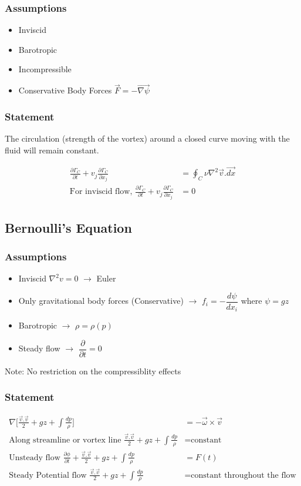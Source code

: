 \documentclass[11pt, letterpaper, notitlepage]{article}
\begin{document}
\subsubsection{Assumptions}
\begin{itemize}
\item Inviscid
\item Barotropic
\item Incompressible
\item Conservative Body Forces $\vec{F} = -\vec{\nabla{\psi}}$
\end{itemize}

\subsubsection{Statement}
The circulation (strength of the vortex) around a closed curve moving with the fluid will remain constant.

\begin{align*}
\frac{\partial \Gamma_C}{\partial t} + v_j \frac{\partial \Gamma_C}{\partial x_j} &= \oint_{C}^{} \nu \nabla^2\vec{v}.\vec{dx} \\
\text{For inviscid flow, } \frac{\partial \Gamma_C}{\partial t} + v_j \frac{\partial \Gamma_C}{\partial x_j} &= 0
\end{align*}

\subsection{Bernoulli's Equation}
\subsubsection{Assumptions}
\begin{itemize}
\item Inviscid $\nabla^2 v = 0$ $\rightarrow$ Euler
\item Only gravitational body forces (Conservative) $\rightarrow$ $f_i = -\dfrac{d \psi}{dx_i}$ where $\psi = g z$
\item Barotropic $\rightarrow$ $\rho = \rho(p)$
\item Steady flow $\rightarrow$ $\dfrac{\partial}{\partial t} = 0$ 
\end{itemize}
Note: No restriction on the compressiblity effects

\subsubsection{Statement}
\begin{align*}
\nabla \Biggl[\frac{\vec{v}.\vec{v}}{2} + g z + \int \frac{dp}{\rho} \Biggr] &= -\vec{\omega} \times \vec{v} \\
\text{Along streamline or vortex line } \frac{\vec{v}.\vec{v}}{2} + g z + \int \frac{dp}{\rho} &= \text{constant}\\
\text{Unsteady flow } \frac{\partial \phi}{\partial t} + \frac{\vec{v}.\vec{v}}{2} + g z + \int \frac{dp}{\rho} &= F(t)\\
\text{Steady Potential flow } \frac{\vec{v}.\vec{v}}{2} + g z + \int \frac{dp}{\rho} &= \text{constant throughout the flow}\\
\end{align*}
\end{document}
